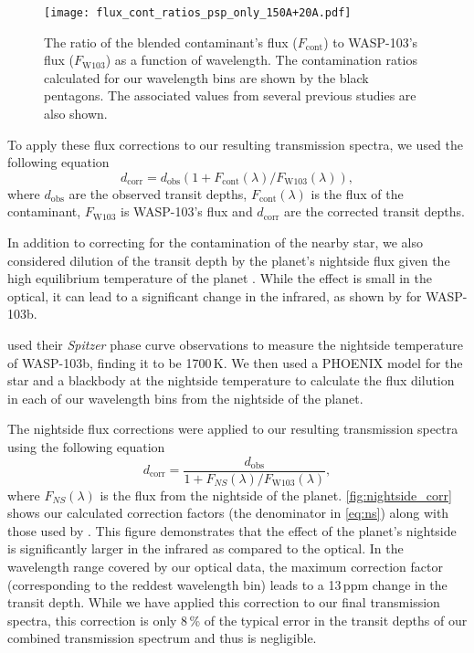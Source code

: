 \documentclass[twocolumn]{aastex63}
\begin{document}
\begin{figure}
    \centering
    \texttt{[image: flux\_cont\_ratios\_psp\_only\_150A+20A.pdf]}
    \caption{The ratio of the blended contaminant's flux ($F_\mathrm{cont}$) to WASP-103's flux ($F_\mathrm{W103}$) as a function of wavelength. The contamination ratios calculated for our wavelength bins are shown by the black pentagons. The associated values from several previous studies are also shown.}
    \label{fig:cont_ratios}
\end{figure}

To apply these flux corrections to our resulting transmission spectra, we used the following equation \cite[e.g.,][]{Kreidberg2018_review}
\begin{equation}
\label{eq:3rd}
    d_\mathrm{corr} = d_\mathrm{obs}(1 + F_\mathrm{cont}(\lambda)/F_\mathrm{W103}(\lambda)),
\end{equation}
where $d_\mathrm{obs}$ are the observed transit depths, $F_\mathrm{cont}(\lambda)$ is the flux of the contaminant, $F_\mathrm{W103}$ is WASP-103's flux and $d_\mathrm{corr}$ are the corrected transit depths. 

In addition to correcting for the contamination of the nearby star, we also considered dilution of the transit depth by the planet's nightside flux given the high equilibrium temperature of the planet \cite[e.g.,][]{Kipping2010}. While the effect is small in the optical, it can lead to a significant change in the infrared, as shown by \cite{Kreidberg2018} for WASP-103b. 

\cite{Kreidberg2018} used their \textit{Spitzer} phase curve observations to measure the nightside temperature of WASP-103b, finding it to be 1700\,K. We then used a PHOENIX model for the star and a blackbody at the nightside temperature to calculate the flux dilution in each of our wavelength bins from the nightside of the planet.

The nightside flux corrections were applied to our resulting transmission spectra using the following equation \cite[e.g.,][]{Kipping2010,Kreidberg2018_review}
\begin{equation}
\label{eq:ns}
    d_\mathrm{corr} = \frac{d_\mathrm{obs}}{1+F_{NS}(\lambda)/F_\mathrm{W103}(\lambda)},
\end{equation}
where $F_{NS}(\lambda)$ is the flux from the nightside of the planet. \autoref{fig:nightside_corr} shows our calculated correction factors (the denominator in \autoref{eq:ns}) along with those used by \cite{Kreidberg2018}. This figure demonstrates that the effect of the planet's nightside is significantly larger in the infrared as compared to the optical. In the wavelength range covered by our optical data, the maximum correction factor (corresponding to the reddest wavelength bin) leads to a 13\,ppm change in the transit depth. While we have applied this correction to our final transmission spectra, this correction is only 8\,\% of the typical error in the transit depths of our combined transmission spectrum and thus is negligible.
\end{document}

